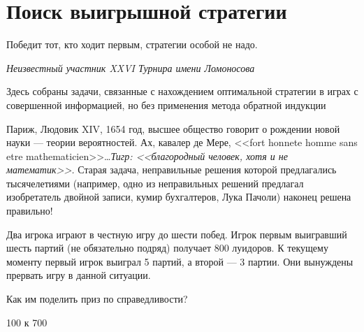 

\section{Поиск выигрышной стратегии}
Победит тот, кто ходит первым, стратегии особой не надо.

{\it Неизвестный участник  XXVI  Турнира имени Ломоносова}


Здесь собраны задачи, связанные с нахождением оптимальной стратегии в играх с совершенной информацией, но без применения метода обратной индукции


\begin{problem} \par
Париж, Людовик XIV, 1654 год, высшее общество говорит о рождении новой науки --- теории вероятностей. Ах, кавалер де Мере, <<fort honnete homme sans etre mathematicien>>\ldots {\it Тигр:  <<благородный человек, хотя и не математик>>.} Старая задача, неправильные решения которой предлагались тысячелетиями (например, одно из неправильных решений предлагал изобретатель двойной записи, кумир бухгалтеров, Лука Пачоли) наконец решена правильно!\par
Два игрока играют в честную игру до шести побед. Игрок первым выигравший шесть партий (не обязательно подряд) получает 800 луидоров. К текущему моменту первый игрок выиграл 5 партий, а второй --- 3 партии. Они вынуждены прервать игру в данной ситуации.\par
Как им поделить приз по справедливости?



\begin{sol}
100 к 700
\end{sol}
\end{problem}





